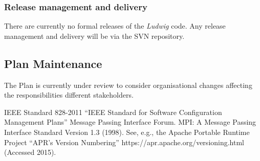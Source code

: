 \documentclass[11pt,twoside]{article}
\begin{document}



\subsubsection{Release management and delivery}

There are currently no formal releases of the \textit{Ludwig} code.
Any release management and  delivery will be via the SVN repository.





\subsection{Plan Maintenance}

The Plan is currently under review to consider organisational changes
affecting the responsibilities different stakeholders.



\begin{thebibliography}{99}
 IEEE Standard 828-2011 ``IEEE Standard for
Software Configuration Management Plans''
 Message Passing Interface Forum. MPI: A Message
Passing Interface Standard Version 1.3 (1998).
 See, e.g., the Apache Portable Runtime Project ``APR's Version Numbering''  https://apr.apache.org/versioning.html (Accessed 2015).
\end{thebibliography}

\vfill\eject
\end{document}
